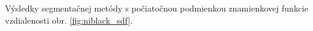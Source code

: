 \documentclass[a4paper,11pt,oneside]{article}%
\begin{document}
Výsledky segmentačnej metódy s počiatočnou podmienkou znamienkovej funkcie vzdialenosti obr. \ref{fig:niblack_sdf}.


\begin{figure}[H]  
    \hspace{5px}

\end{figure}
\end{document}
